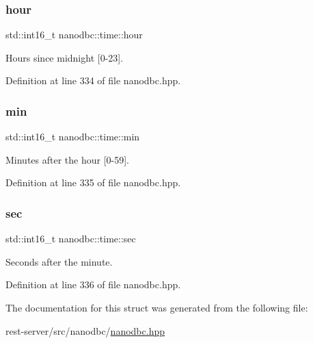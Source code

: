 \subsubsection{\texorpdfstring{hour}{hour}}
{\footnotesize\ttfamily std\+::int16\+\_\+t nanodbc\+::time\+::hour}



Hours since midnight \mbox{[}0-\/23\mbox{]}. 



Definition at line 334 of file nanodbc.\+hpp.

\mbox{\label{structnanodbc_1_1time_a343d25fdd7c3e67467bf18d3d9cc82c9}} 
\subsubsection{\texorpdfstring{min}{min}}
{\footnotesize\ttfamily std\+::int16\+\_\+t nanodbc\+::time\+::min}



Minutes after the hour \mbox{[}0-\/59\mbox{]}. 



Definition at line 335 of file nanodbc.\+hpp.

\mbox{\label{structnanodbc_1_1time_a57df2df9fcc00af1e9c34e95899a420b}} 
\subsubsection{\texorpdfstring{sec}{sec}}
{\footnotesize\ttfamily std\+::int16\+\_\+t nanodbc\+::time\+::sec}



Seconds after the minute. 



Definition at line 336 of file nanodbc.\+hpp.



The documentation for this struct was generated from the following file\+:\begin{DoxyCompactItemize}
\item 
rest-\/server/src/nanodbc/\mbox{\hyperlink{nanodbc_8hpp}{nanodbc.\+hpp}}\end{DoxyCompactItemize}
